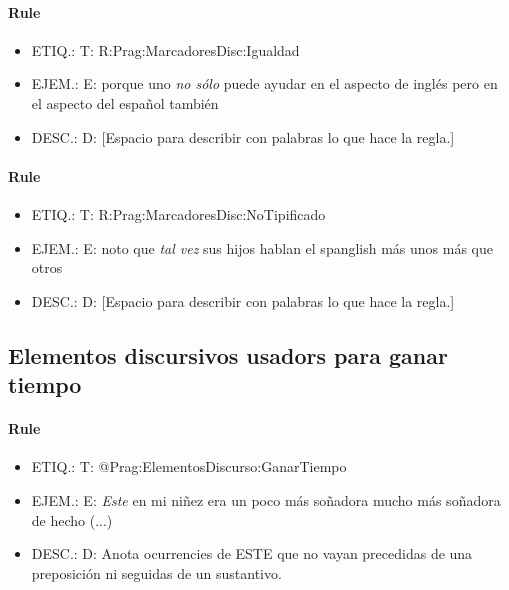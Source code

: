 \documentclass[11pt]{report}
\begin{document}
\paragraph*{Rule}
\begin{itemize}
\item ETIQ.:  T: R:Prag:MarcadoresDisc:Igualdad
\item EJEM.:  E: porque uno \emph{no sólo} puede ayudar en el aspecto de inglés pero en el aspecto del español también
\item DESC.:  D: [Espacio para describir con palabras lo que hace la regla.]
\end{itemize}

\paragraph*{Rule}
\begin{itemize}
\item ETIQ.:  T: R:Prag:MarcadoresDisc:NoTipificado
\item EJEM.:  E: noto que \emph{tal vez} sus hijos hablan el spanglish más unos más que otros
\item DESC.:  D: [Espacio para describir con palabras lo que hace la regla.]
\end{itemize}

\subsection{Elementos discursivos usadors para ganar tiempo}
\paragraph*{Rule}
\begin{itemize}
\item ETIQ.:  T: @Prag:ElementosDiscurso:GanarTiempo
\item EJEM.:  E: \emph{Este} en mi niñez era un poco más soñadora mucho más soñadora de hecho (...)
\item DESC.:  D: Anota ocurrencies de ESTE que no vayan precedidas de una preposición ni seguidas de un sustantivo.
\end{itemize}
\end{document}
